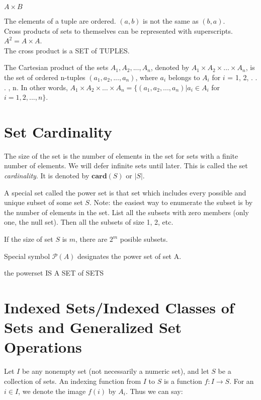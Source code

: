 $A \times B$
\begin{notes}
The elements of a tuple are ordered. $(a,b)$ is not the same as $(b, a)$.\\
Cross products of sets to themselves can be represented with superscripts. $A^2=A \times A$.\\
The cross product is a SET of TUPLES.
\end{notes}

    \begin {definition}
    The Cartesian product of the sets $A_1,A_2, . . . , A_n$, denoted by $A_1 \times A_2 \times \dots \times A_n$, is the
set of ordered n-tuples $(a_1, a_2, . . . , a_n)$, where $a_i$ belongs to $A_i$ for $i$ = 1, 2, . . . , n. In other
words,
$A_1 \times A_2 \times \dots \times A_n = \{(a_1, a_2, . . . , a_n) | a_i \in A_i$ for $i = 1, 2, . . . , n\}$.
    \end {definition}

\section {Set Cardinality}
\begin {definition}
The size of the set is the number of elements in the set for sets with a finite number of elements. We will defer infinite sets until later. This is called the set \textit{cardinality}. It is denoted by $\mathbf{card}(S)$ or $|S|$.
\end{definition}

\begin{definition}[Powerset]
A special set called the power set is that set which includes every possible and unique subset of some set $S$. 
Note: the easiest way to enumerate the subset is by the number of elements in the set. List all the subsets with zero members (only one, the null set). Then all the subsets of size 1, 2, etc. 
\end{definition}
\begin {theorem}
If the size of set $S$ is $m$, there are $2^m$ posible subsets.
\end{theorem}

Special symbol  $\mathcal{P} (A)$ designates the power set of set A.

\begin{notes}
the powerset IS A SET of SETS
\end{notes}


\section {Indexed Sets/Indexed Classes of Sets and Generalized Set Operations }
Let $I$ be any nonempty set (not necessarily a numeric set), and let $S$ be a collection of sets. An indexing function from $I$ to $S$ is a function $f:I \rightarrow S$. For an $i \in I$, we denote the image $f(i)$ by $A_i$. Thus we can say:

